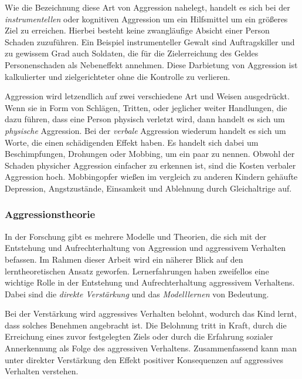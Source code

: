 Wie die Bezeichnung diese Art von Aggression nahelegt, handelt es sich bei der 
\textit{instrumentellen} oder kognitiven Aggression um ein Hilfsmittel um ein größeres Ziel zu 
erreichen. Hierbei besteht keine zwangläufige Absicht einer Person Schaden zuzuführen. %
Ein Beispiel instrumenteller Gewalt sind Auftragskiller und zu gewissem Grad auch Soldaten, die
für die Zielerreichung des Geldes Personenschaden als Nebeneffekt annehmen. Diese Darbietung
von Aggression ist kalkulierter und zielgerichteter ohne die Kontrolle zu verlieren. %

Aggression wird letzendlich auf zwei verschiedene Art und Weisen ausgedrückt. Wenn sie in Form
von Schlägen, Tritten, oder jeglicher weiter Handlungen, die dazu führen, dass eine Person 
physisch verletzt wird, dann handelt es sich um \textit{physische} Aggression. 
Bei der \textit{verbale} Aggression wiederum handelt es sich um Worte, die einen schädigenden 
Effekt haben. Es handelt sich dabei um Beschimpfungen, Drohungen oder Mobbing, um ein paar zu 
nennen. %
Obwohl der Schaden physicher Aggression einfacher zu erkennen ist, sind die Kosten verbaler 
Aggression hoch. Mobbingopfer wießen im vergleich zu anderen Kindern gehäufte Depression, 
Angstzustände, Einsamkeit und Ablehnung durch Gleichaltrige auf. %



\subsubsection{Aggressionstheorie}    \label{subsubsec_2.1.3.2}
In der Forschung gibt es mehrere Modelle und Theorien, die sich  mit der Entstehung und 
Aufrechterhaltung von Aggression und aggressivem Verhalten befassen. Im Rahmen dieser Arbeit wird
ein näherer Blick auf den lerntheoretischen Ansatz geworfen. Lernerfahrungen haben zweifellos eine
wichtige Rolle in der Entstehung und Aufrechterhaltung aggressivem Verhaltens. %
Dabei sind die \textit{direkte Verstärkung} und das \textit{Modelllernen} von Bedeutung. 

Bei der Verstärkung wird aggressives Verhalten belohnt, wodurch das Kind lernt, dass solches 
Benehmen angebracht ist. Die Belohnung tritt in Kraft, durch die Erreichung eines zuvor festgelegten
Ziels oder durch die Erfahrung sozialer Annerkennung als Folge des aggressiven Verhaltens. 
Zusammenfassend kann man unter direkter Verstärkung den Effekt positiver Konsequenzen auf aggressives 
Verhalten verstehen. %

